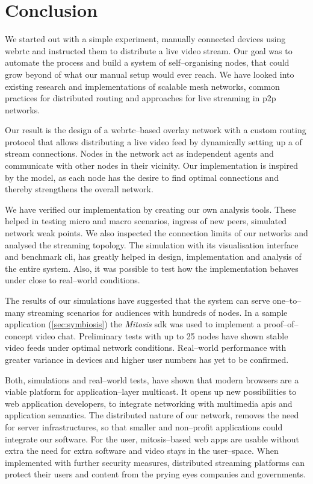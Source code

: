 \section{Conclusion}
We started out with a simple experiment, manually connected devices using \gls{webrtc} and instructed them to distribute a live video stream.
Our goal was to automate the process and build a system of self–organising nodes, that could grow beyond of what our manual setup would ever reach.
We have looked into existing research and implementations of scalable mesh networks, common practices for distributed routing and approaches for live streaming in \gls{p2p} networks.

Our result is the design of a \gls{webrtc}–based overlay network with a custom routing protocol that allows distributing a live video feed by dynamically setting up a  of stream connections. Nodes in the network act as independent agents and communicate with other nodes in their vicinity. Our implementation is inspired by the  model, as each node has the desire to find optimal connections and thereby strengthens the overall network.

We have verified our implementation by creating our own analysis tools. These helped in testing micro and macro scenarios, ingress of new peers, simulated network weak points. We also inspected the connection limits of our networks and analysed the streaming topology. The simulation with its visualisation interface and benchmark \gls{cli}, has greatly helped in design, implementation and analysis of the entire system. Also, it was possible to test how the implementation behaves under close to real–world conditions.

The results of our simulations have suggested that the system can serve one–to–many streaming scenarios for audiences with hundreds of nodes. In a sample application (\vref{sec:symbiosis}) the \textit{Mitosis} \gls{sdk} was used to implement a proof–of–concept video chat. Preliminary tests with up to 25 nodes have shown stable video feeds under optimal network conditions. Real–world performance with greater variance in devices and higher user numbers has yet to be confirmed.

Both, simulations and real–world tests, have shown that modern browsers are a viable platform for application–layer multicast. It opens up new possibilities to web application developers, to integrate networking with multimedia \glspl{api} and application semantics. The distributed nature of our network, removes the need for server infrastructures, so that smaller and non–profit applications could integrate our software. For the user, \gls{mitosis}–based web apps are usable without extra the need for extra software and video stays in the user–space. When implemented with further security measures, distributed streaming platforms can protect their users and content from the prying eyes companies and governments.


